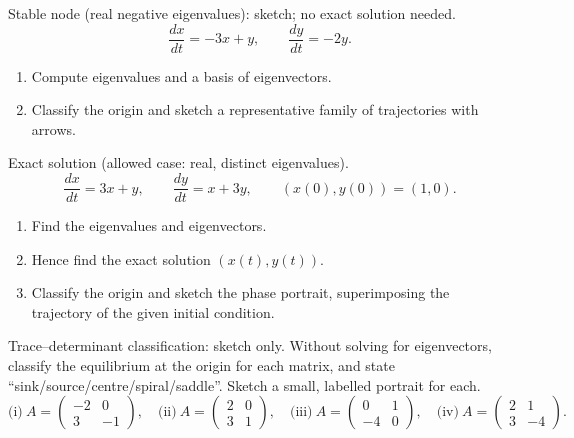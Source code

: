 \documentclass[11pt]{article}
\def\textbf#1{#1}%
\newcounter{question}
\begin{document}
\begin{question}
\textbf{Stable node (real negative eigenvalues): sketch; no exact solution needed.}
\[
\frac{dx}{dt}=-3x+y,\qquad \frac{dy}{dt}=-2y.
\]
\begin{enumerate}
  \item Compute eigenvalues and a basis of eigenvectors.
  \item Classify the origin and sketch a representative family of trajectories with arrows.
\end{enumerate}
\end{question}

\begin{question}
\textbf{Exact solution (allowed case: real, distinct eigenvalues).}
\[
\frac{dx}{dt}=3x+y,\qquad \frac{dy}{dt}=x+3y,\qquad (x(0),y(0))=(1,0).
\]
\begin{enumerate}
  \item Find the eigenvalues and eigenvectors.
  \item Hence find the exact solution $(x(t),y(t))$.
  \item Classify the origin and sketch the phase portrait, superimposing the trajectory of the given initial condition.
\end{enumerate}
\end{question}

\begin{question}
\textbf{Trace–determinant classification: sketch only.}
Without solving for eigenvectors, classify the equilibrium at the origin for each matrix,
and state “sink/source/centre/spiral/saddle”. Sketch a small, labelled portrait for each.
\[
\text{(i)}\ A=\begin{pmatrix}-2&0\\ 3&-1\end{pmatrix},\quad
\text{(ii)}\ A=\begin{pmatrix}2&0\\ 3&1\end{pmatrix},\quad
\text{(iii)}\ A=\begin{pmatrix}0&1\\ -4&0\end{pmatrix},\quad
\text{(iv)}\ A=\begin{pmatrix}2&1\\ 3&-4\end{pmatrix}.
\]
\end{question}
\end{document}
